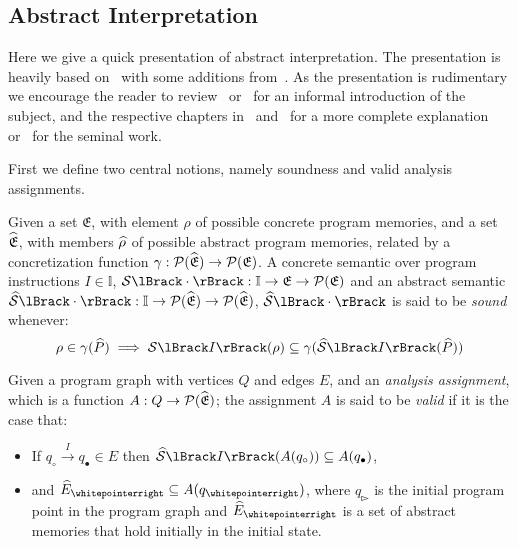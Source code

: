 \subsection{Abstract Interpretation}\label{subsec:abstract-interpretation}

Here we give a quick presentation of abstract interpretation.
The presentation is heavily based on~\cite{nielson_formal_2019} with some additions from~\cite{moller_statitc_nodate}.
As the presentation is rudimentary we encourage the reader to review~\cite{noauthor_abstract_nodate} or~\cite{cousot_abstract_1996} for an informal introduction of the subject, and the respective chapters in~\cite{nielson_formal_2019} and~\cite{moller_statitc_nodate} for a more complete explanation or~\cite{cousot_abstract_1977} for the seminal work.

First we define two central notions, namely soundness and valid analysis assignments.

\begin{definition}
    Given a set $\mathfrak{E}$, with element $\rho$ of possible concrete program memories, and a set $\widehat{\mathfrak{E}}$, with members $\widehat{\rho}$ of possible abstract program memories, related by a concretization function $\gamma : \mathcal{P}(\widehat{\mathfrak{E}}) \rightarrow \mathcal{P}(\mathfrak{E})$.
    A concrete semantic over program instructions $I \in \mathbb{I}$, $\sem{\cdot} : \mathbb{I} \rightarrow \mathfrak{E} \rightarrow \mathcal{P}(\mathfrak{E})$ and an abstract semantic $\abssem{\cdot} : \mathbb{I} \rightarrow \mathcal{P}(\ab{\mathfrak{E}}) \rightarrow \mathcal{P}(\ab{\mathfrak{E}})$, $\abssem{\cdot}$ is said to be \emph{sound} whenever:
    \begin{equation}
        \rho \in \concrete(\ab{P}) \implies \sem{I}(\rho) \subseteq \concrete(\abssem{I}(\ab{P}))\label{eq:equation12}
    \end{equation}
\end{definition}

\begin{definition}
    \label{def:valid}
    Given a program graph with vertices $Q$ and edges $E$, and an \emph{analysis assignment}, which is a function $A : Q \rightarrow \mathcal{P}(\widehat{\mathfrak{E}})$; the assignment $A$ is said to be \emph{valid} if it is the case that:
    \begin{itemize}
        \item If $q_\circ \xrightarrow{I} q_\bullet \in E$ then $\abssem{I}(A(q_\circ)) \subseteq A(q_\bullet)$,
        \item and $\ab{E}_\whitepointerright \subseteq A(q_\whitepointerright)$, where $q_\whitepointerright$ is the initial program point in the program graph and $\ab{E}_\whitepointerright$ is a set of abstract memories that hold initially in the initial state.
    \end{itemize}
\end{definition}

